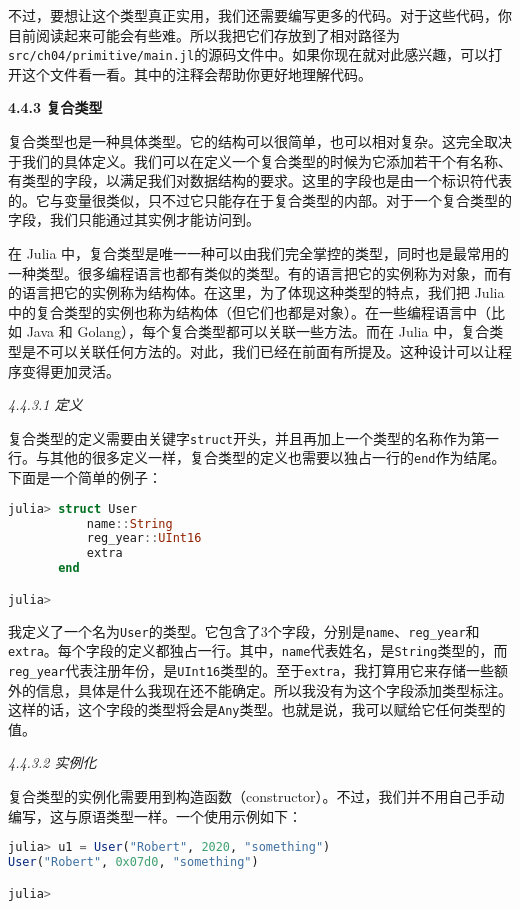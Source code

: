 不过，要想让这个类型真正实用，我们还需要编写更多的代码。对于这些代码，你目前阅读起来可能会有些难。所以我把它们存放到了相对路径为\verb`src/ch04/primitive/main.jl`的源码文件中。如果你现在就对此感兴趣，可以打开这个文件看一看。其中的注释会帮助你更好地理解代码。

\textbf{4.4.3 复合类型}

复合类型也是一种具体类型。它的结构可以很简单，也可以相对复杂。这完全取决于我们的具体定义。我们可以在定义一个复合类型的时候为它添加若干个有名称、有类型的字段，以满足我们对数据结构的要求。这里的字段也是由一个标识符代表的。它与变量很类似，只不过它只能存在于复合类型的内部。对于一个复合类型的字段，我们只能通过其实例才能访问到。

在 Julia 中，复合类型是唯一一种可以由我们完全掌控的类型，同时也是最常用的一种类型。很多编程语言也都有类似的类型。有的语言把它的实例称为对象，而有的语言把它的实例称为结构体。在这里，为了体现这种类型的特点，我们把 Julia 中的复合类型的实例也称为结构体（但它们也都是对象）。在一些编程语言中（比如 Java 和 Golang），每个复合类型都可以关联一些方法。而在 Julia 中，复合类型是不可以关联任何方法的。对此，我们已经在前面有所提及。这种设计可以让程序变得更加灵活。

\textsl{4.4.3.1 定义}

复合类型的定义需要由关键字\verb`struct`开头，并且再加上一个类型的名称作为第一行。与其他的很多定义一样，复合类型的定义也需要以独占一行的\verb`end`作为结尾。下面是一个简单的例子：

\begin{lstlisting}[language=julia]
julia> struct User
           name::String
           reg_year::UInt16
           extra
       end

julia> 
\end{lstlisting}

我定义了一个名为\verb`User`的类型。它包含了3个字段，分别是\verb`name`、\verb`reg_year`和\verb`extra`。每个字段的定义都独占一行。其中，\verb`name`代表姓名，是\verb`String`类型的，而\verb`reg_year`代表注册年份，是\verb`UInt16`类型的。至于\verb`extra`，我打算用它来存储一些额外的信息，具体是什么我现在还不能确定。所以我没有为这个字段添加类型标注。这样的话，这个字段的类型将会是\verb`Any`类型。也就是说，我可以赋给它任何类型的值。

\textsl{4.4.3.2 实例化}

复合类型的实例化需要用到构造函数（constructor）。不过，我们并不用自己手动编写，这与原语类型一样。一个使用示例如下：

\begin{lstlisting}[language=julia]
julia> u1 = User("Robert", 2020, "something")
User("Robert", 0x07d0, "something")

julia> 
\end{lstlisting}

